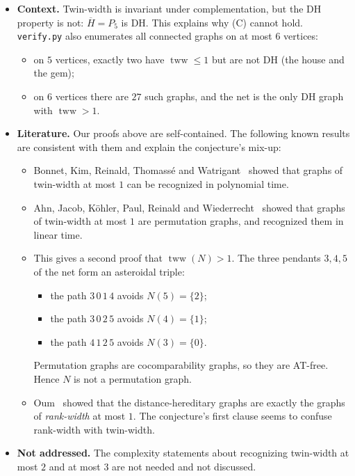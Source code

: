 \documentclass[11pt]{article}
\theoremstyle{definition}
\theoremstyle{remark}
\begin{document}
\begin{itemize}
\item \textbf{Context.} Twin-width is invariant under complementation, but the DH
property is not: $\overline{H}=P_5$ is DH. This explains why (C) cannot hold.
\verb|verify.py| also enumerates all connected graphs on at most $6$ vertices:
\begin{itemize}
\item on $5$ vertices, exactly two have $\operatorname{tww}\le1$ but are not DH (the
house and the gem);
\item on $6$ vertices there are $27$ such graphs, and the net is the only DH graph with
$\operatorname{tww}>1$.
\end{itemize}
\item \textbf{Literature.} Our proofs above are self-contained. The following known results
are consistent with them and explain the conjecture's mix-up:
\begin{itemize}
\item Bonnet, Kim, Reinald, Thomass\'e and Watrigant~\cite{bkrtw} showed that graphs of
twin-width at most $1$ can be recognized in polynomial time.
\item Ahn, Jacob, K\"ohler, Paul, Reinald and Wiederrecht~\cite{twinwidthone} showed that
graphs of twin-width at most $1$ are permutation graphs, and recognized them in linear time.
\item This gives a second proof that $\operatorname{tww}(N)>1$. The three pendants $3,4,5$ of
the net form an asteroidal triple:
\begin{itemize}
\item the path $3\,0\,1\,4$ avoids $N(5)=\{2\}$;
\item the path $3\,0\,2\,5$ avoids $N(4)=\{1\}$;
\item the path $4\,1\,2\,5$ avoids $N(3)=\{0\}$.
\end{itemize}
Permutation graphs are cocomparability graphs, so they are AT-free. Hence $N$ is not a
permutation graph.
\item Oum~\cite{oum} showed that the distance-hereditary graphs are exactly the graphs of
\emph{rank-width} at most $1$. The conjecture's first clause seems to confuse rank-width
with twin-width.
\end{itemize}
\item \textbf{Not addressed.} The complexity statements about recognizing twin-width at
most $2$ and at most $3$ are not needed and not discussed.
\end{itemize}
\end{document}
